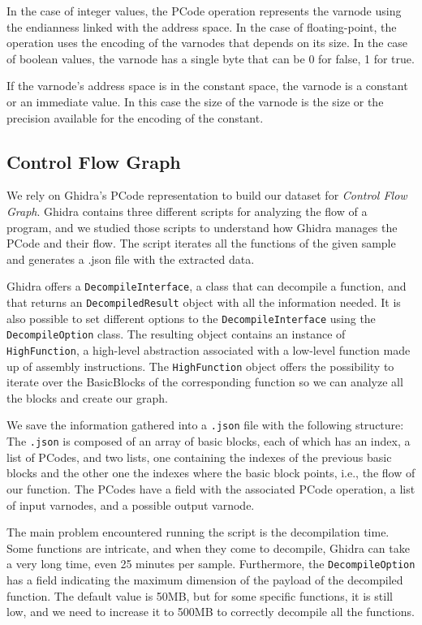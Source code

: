 In the case of integer values, the PCode operation represents the varnode using the endianness linked with the address space.
In the case of floating-point, the operation uses the encoding of the varnodes that depends on its size.
In the case of boolean values, the varnode has a single byte that can be 0 for false, 1 for true.

If the varnode's address space is in the constant space, the varnode is a constant or an immediate value. In this case the size of the varnode is the size or the precision available for the encoding of the constant.



\subsection{Control Flow Graph}
\label{subsec:cfg_ghidra}
We rely on Ghidra's PCode representation to build our dataset for \textit{Control Flow Graph}. Ghidra contains three different scripts for analyzing the flow of a program, and we studied those scripts to understand how Ghidra manages the PCode and their flow. The script iterates all the functions of the given sample and generates a .json file with the extracted data.

Ghidra offers a \texttt{DecompileInterface}, a class that can decompile a function, and that returns an  \texttt{DecompiledResult} object with all the information needed. It is also possible to set different options to the \texttt{DecompileInterface} using the \texttt{DecompileOption} class. The resulting object contains an instance of \texttt{HighFunction}, a high-level abstraction associated with a low-level function made up of assembly instructions. The \texttt{HighFunction} object offers the possibility to iterate over the BasicBlocks of the corresponding function so we can analyze all the blocks and create our graph.

We save the information gathered into a \texttt{.json} file with the following structure:
The \texttt{.json} is composed of an array of basic blocks, each of which has an index, a list of PCodes, and two lists, one containing the indexes of the previous basic blocks and the other one the indexes where the basic block points, i.e., the flow of our function. The PCodes have a field with the associated PCode operation, a list of input varnodes, and a possible output varnode.

The main problem encountered running the script is the decompilation time. Some functions are intricate, and when they come to decompile, Ghidra can take a very long time, even 25 minutes per sample.  Furthermore, the \texttt{DecompileOption} has a field indicating the maximum dimension of the payload of the decompiled function. The default value is 50MB, but for some specific functions, it is still low, and we need to increase it to 500MB to correctly decompile all the functions.

